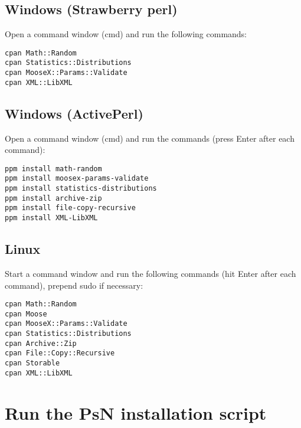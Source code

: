 \subsection{Windows (Strawberry perl)}
Open a command window (cmd) and run the following commands:

\begin{verbatim}
cpan Math::Random
cpan Statistics::Distributions
cpan MooseX::Params::Validate
cpan XML::LibXML
\end{verbatim}


\subsection{Windows (ActivePerl)}

Open a command window (cmd) and run the commands (press Enter after each command):
\begin{verbatim}
ppm install math-random
ppm install moosex-params-validate
ppm install statistics-distributions
ppm install archive-zip
ppm install file-copy-recursive
ppm install XML-LibXML
\end{verbatim}


\subsection{Linux}

Start a command window and run the following commands (hit Enter after each command), prepend sudo if necessary:
\begin{verbatim}
cpan Math::Random
cpan Moose
cpan MooseX::Params::Validate
cpan Statistics::Distributions
cpan Archive::Zip
cpan File::Copy::Recursive
cpan Storable
cpan XML::LibXML
\end{verbatim}

\section{Run the PsN installation script}

